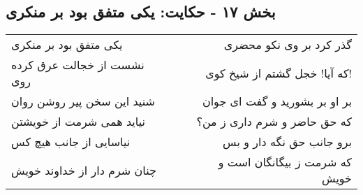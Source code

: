\begin{center}
\section*{بخش ۱۷ - حکایت: یکی متفق بود بر منکری}
\label{sec:017}
\begin{longtable}{l p{0.5cm} r}
یکی متفق بود بر منکری
&&
گذر کرد بر وی نکو محضری
\\
نشست از خجالت عرق کرده روی
&&
که آیا! خجل گشتم از شیخ کوی!
\\
شنید این سخن پیر روشن روان
&&
بر او بر بشورید و گفت ای جوان
\\
نیاید همی شرمت از خویشتن
&&
که حق حاضر و شرم داری ز من؟
\\
نیاسایی از جانب هیچ کس
&&
برو جانب حق نگه دار و بس
\\
چنان شرم دار از خداوند خویش
&&
که شرمت ز بیگانگان است و خویش
\\
\end{longtable}
\end{center}
